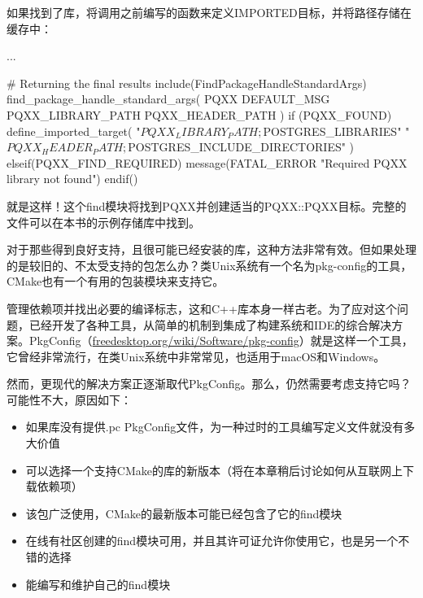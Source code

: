 如果找到了库，将调用之前编写的函数来定义IMPORTED目标，并将路径存储在缓存中：


\begin{cmake}
...

# Returning the final results
include(FindPackageHandleStandardArgs)
find_package_handle_standard_args(
    PQXX DEFAULT_MSG PQXX_LIBRARY_PATH PQXX_HEADER_PATH
)
if (PQXX_FOUND)
    define_imported_target(
        "${PQXX_LIBRARY_PATH};${POSTGRES_LIBRARIES}"
        "${PQXX_HEADER_PATH};${POSTGRES_INCLUDE_DIRECTORIES}"
    )
elseif(PQXX_FIND_REQUIRED)
    message(FATAL_ERROR "Required PQXX library not found")
endif()
\end{cmake}

就是这样！这个find模块将找到PQXX并创建适当的PQXX::PQXX目标。完整的文件可以在本书的示例存储库中找到。

对于那些得到良好支持，且很可能已经安装的库，这种方法非常有效。但如果处理的是较旧的、不太受支持的包怎么办？类Unix系统有一个名为pkg-config的工具，CMake也有一个有用的包装模块来支持它。


管理依赖项并找出必要的编译标志，这和C++库本身一样古老。为了应对这个问题，已经开发了各种工具，从简单的机制到集成了构建系统和IDE的综合解决方案。PkgConfig（\url{freedesktop.org/wiki/Software/pkg-config}）就是这样一个工具，它曾经非常流行，在类Unix系统中非常常见，也适用于macOS和Windows。

然而，更现代的解决方案正逐渐取代PkgConfig。那么，仍然需要考虑支持它吗？可能性不大，原因如下：

\begin{itemize}
\item
如果库没有提供.pc PkgConfig文件，为一种过时的工具编写定义文件就没有多大价值

\item
可以选择一个支持CMake的库的新版本（将在本章稍后讨论如何从互联网上下载依赖项）

\item
该包广泛使用，CMake的最新版本可能已经包含了它的find模块

\item
在线有社区创建的find模块可用，并且其许可证允许你使用它，也是另一个不错的选择

\item
能编写和维护自己的find模块
\end{itemize}

